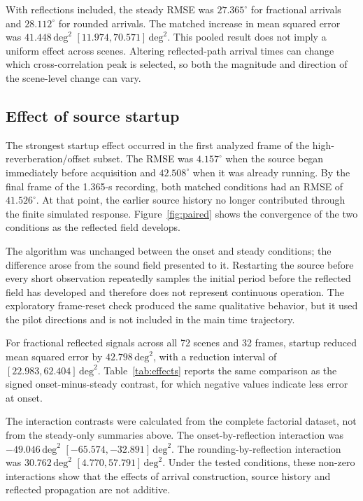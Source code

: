 \documentclass{edpsci}
\begin{document}
With reflections included, the steady RMSE was $27.365^\circ$ for fractional arrivals and $28.112^\circ$ for rounded arrivals. The matched increase in mean squared error was $41.448\,\mathrm{deg}^2$ $[11.974,70.571]\,\mathrm{deg}^2$. This pooled result does not imply a uniform effect across scenes. Altering reflected-path arrival times can change which cross-correlation peak is selected, so both the magnitude and direction of the scene-level change can vary.

\subsection{Effect of source startup}

The strongest startup effect occurred in the first analyzed frame of the high-reverberation/offset subset. The RMSE was $4.157^\circ$ when the source began immediately before acquisition and $42.508^\circ$ when it was already running. By the final frame of the 1.365-s recording, both matched conditions had an RMSE of $41.526^\circ$. At that point, the earlier source history no longer contributed through the finite simulated response. Figure~\ref{fig:paired} shows the convergence of the two conditions as the reflected field develops.

The algorithm was unchanged between the onset and steady conditions; the difference arose from the sound field presented to it. Restarting the source before every short observation repeatedly samples the initial period before the reflected field has developed and therefore does not represent continuous operation. The exploratory frame-reset check produced the same qualitative behavior, but it used the pilot directions and is not included in the main time trajectory.

For fractional reflected signals across all 72 scenes and 32 frames, startup reduced mean squared error by $42.798\,\mathrm{deg}^2$, with a reduction interval of $[22.983,62.404]\,\mathrm{deg}^2$. Table~\ref{tab:effects} reports the same comparison as the signed onset-minus-steady contrast, for which negative values indicate less error at onset.

The interaction contrasts were calculated from the complete factorial dataset, not from the steady-only summaries above. The onset-by-reflection interaction was $-49.046\,\mathrm{deg}^2$ $[-65.574,-32.891]\,\mathrm{deg}^2$. The rounding-by-reflection interaction was $30.762\,\mathrm{deg}^2$ $[4.770,57.791]\,\mathrm{deg}^2$. Under the tested conditions, these non-zero interactions show that the effects of arrival construction, source history and reflected propagation are not additive.
\end{document}
